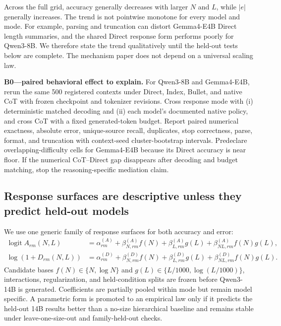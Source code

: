 Across the full grid, accuracy generally decreases with larger \(N\) and \(L\), while \(|e|\) generally increases. The trend is not pointwise monotone for every model and mode. For example, parsing and truncation can distort Gemma4-E4B Direct length summaries, and the shared Direct response form performs poorly for Qwen3-8B. We therefore state the trend qualitatively until the held-out tests below are complete. The mechanism paper does not depend on a universal scaling law.

\begin{todobox}
\textbf{B0---paired behavioral effect to explain.}
For Qwen3-8B and Gemma4-E4B, rerun the same 500 registered contexts under Direct, Index, Bullet, and native CoT with frozen checkpoint and tokenizer revisions. Cross response mode with (i) deterministic matched decoding and (ii) each model's documented native policy, and cross CoT with a fixed generated-token budget. Report paired numerical exactness, absolute error, unique-source recall, duplicates, stop correctness, parse, format, and truncation with context-seed cluster-bootstrap intervals. Predeclare overlapping-difficulty cells for Gemma4-E4B because its Direct accuracy is near floor. If the numerical CoT--Direct gap disappears after decoding and budget matching, stop the reasoning-specific mediation claim.
\end{todobox}

\subsection{Response surfaces are descriptive unless they predict held-out models}

We use one generic family of response surfaces for both accuracy and error:
\begin{align}
\operatorname{logit} A_{rm}(N,L)
  &=\alpha^{(A)}_{rm}
    +\beta^{(A)}_{N,rm}f(N)
    +\beta^{(A)}_{L,rm}g(L)
    +\beta^{(A)}_{NL,rm}f(N)g(L),\\
\log\!\left(1+D_{rm}(N,L)\right)
  &=\alpha^{(D)}_{rm}
    +\beta^{(D)}_{N,rm}f(N)
    +\beta^{(D)}_{L,rm}g(L)
    +\beta^{(D)}_{NL,rm}f(N)g(L).
\label{eq:response-surface}
\end{align}
Candidate bases \(f(N)\in\{N,\log N\}\) and \(g(L)\in\{L/1000,\log(L/1000)\}\), interactions, regularization, and held-condition splits are frozen before Qwen3-14B is generated. Coefficients are partially pooled within mode but remain model specific. A parametric form is promoted to an empirical law only if it predicts the held-out 14B results better than a no-size hierarchical baseline and remains stable under leave-one-size-out and family-held-out checks.

